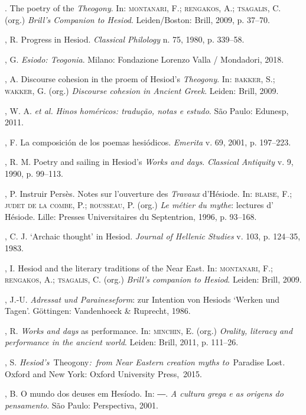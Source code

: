 \begin{bibliohedra}
\titidem. The poetry of the \emph{Theogony}. In: \textsc{montanari}, F.; \textsc{rengakos}, A.; \textsc{tsagalis}, C. (org.) \emph{Brill's Companion to Hesiod}. Leiden/Boston:
Brill, 2009, p. 37--70.

, R. Progress in Hesiod. \emph{Classical Philology} n. 75, 1980,
p. 339--58.

, G. \emph{Esiodo: Teogonia}. Milano: Fondazione Lorenzo
Valla / Mondadori, 2018.

, A. Discourse cohesion in the proem of Hesiod's
\emph{Theogony}. In: \textsc{bakker}, S.; \textsc{wakker}, G. (org.) \emph{Discourse
cohesion in Ancient Greek}. Leiden: Brill, 2009.

, W. A. \emph{et al.} \emph{Hinos homéricos: tradução, notas
e estudo}. São Paulo: Edunesp, 2011.

, F. La composición de los poemas hesiódicos.
\emph{Emerita} v. 69, 2001, p. 197--223.

, R. M. Poetry and sailing in Hesiod's \emph{Works and days}.
\emph{Classical Antiquity} v. 9, 1990, p. 99--113.

, P. Instruir Persès. Notes sur l'ouverture des \emph{Travaux}
d'Hésiode. In: \textsc{blaise}, F.; \textsc{judet de la combe}, P.; \textsc{rousseau}, P. (org.)
\emph{Le métier du mythe}: lectures d' Hésiode. Lille: Presses
Universitaires du Septentrion, 1996, p. 93--168.

, C. J. `Archaic thought' in Hesiod. \emph{Journal of Hellenic
Studies} v. 103, p. 124--35, 1983.

, I. Hesiod and the literary traditions of the Near East. In:
\textsc{montanari}, F.; \textsc{rengakos}, A.; \textsc{tsagalis}, C. (org.) \emph{Brill's companion to Hesiod}. Leiden: Brill, 2009.

, J.-U. \emph{Adressat und Paraineseform}: zur Intention von
Hesiods `Werken und Tagen'. Göttingen: Vandenhoeck \& Ruprecht, 1986.

, R. \emph{Works and days} as performance. In: \textsc{minchin}, E. (org.)
\emph{Orality, literacy and performance in the ancient world}. Leiden:
Brill, 2011, p. 111--26.

, S. \emph{Hesiod's~}Theogony\emph{:~from Near Eastern
creation myths to}~Paradise Lost\emph{.} Oxford and New York: Oxford
University Press,~2015.

, B. O mundo dos deuses em Hesíodo. In: ―. \emph{A cultura grega e
as origens do pensamento}. São Paulo: Perspectiva, 2001.


\end{bibliohedra}
